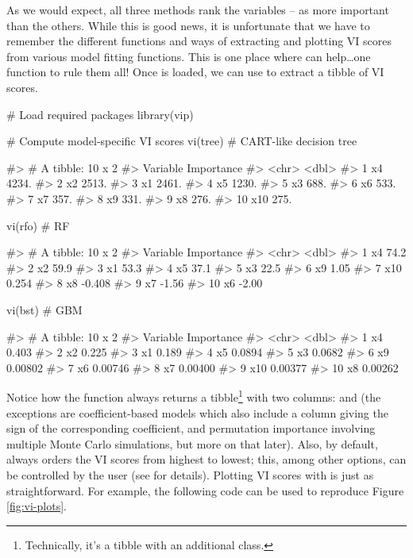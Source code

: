 As we would expect, all three methods rank the variables
-- as more important than the others. While this is
good news, it is unfortunate that we have to remember the different
functions and ways of extracting and plotting VI scores from various
model fitting functions. This is one place where  can
help\ldots{}one function to rule them all! Once  is loaded, we
can use  to extract a tibble of VI scores.

\begin{Schunk}
\begin{Sinput}
# Load required packages
library(vip)

# Compute model-specific VI scores
vi(tree)  # CART-like decision tree
\end{Sinput}
\begin{Soutput}
#> # A tibble: 10 x 2
#>    Variable Importance
#>    <chr>         <dbl>
#>  1 x4            4234.
#>  2 x2            2513.
#>  3 x1            2461.
#>  4 x5            1230.
#>  5 x3             688.
#>  6 x6             533.
#>  7 x7             357.
#>  8 x9             331.
#>  9 x8             276.
#> 10 x10            275.
\end{Soutput}
\begin{Sinput}
vi(rfo)   # RF
\end{Sinput}
\begin{Soutput}
#> # A tibble: 10 x 2
#>    Variable Importance
#>    <chr>         <dbl>
#>  1 x4           74.2  
#>  2 x2           59.9  
#>  3 x1           53.3  
#>  4 x5           37.1  
#>  5 x3           22.5  
#>  6 x9            1.05 
#>  7 x10           0.254
#>  8 x8           -0.408
#>  9 x7           -1.56 
#> 10 x6           -2.00
\end{Soutput}
\begin{Sinput}
vi(bst)   # GBM
\end{Sinput}
\begin{Soutput}
#> # A tibble: 10 x 2
#>    Variable Importance
#>    <chr>         <dbl>
#>  1 x4          0.403  
#>  2 x2          0.225  
#>  3 x1          0.189  
#>  4 x5          0.0894 
#>  5 x3          0.0682 
#>  6 x9          0.00802
#>  7 x6          0.00746
#>  8 x7          0.00400
#>  9 x10         0.00377
#> 10 x8          0.00262
\end{Soutput}
\end{Schunk}

Notice how the  function always returns a
tibble\footnote{Technically, it's a tibble with an additional  class.}
with two columns:  and  (the exceptions
are coefficient-based models which also include a  column
giving the sign of the corresponding coefficient, and permutation
importance involving multiple Monte Carlo simulations, but more on that
later). Also, by default,  always orders the VI scores from
highest to lowest; this, among other options, can be controlled by the
user (see  for details). Plotting VI scores with
 is just as straightforward. For example, the following code
can be used to reproduce Figure \ref{fig:vi-plots}.


